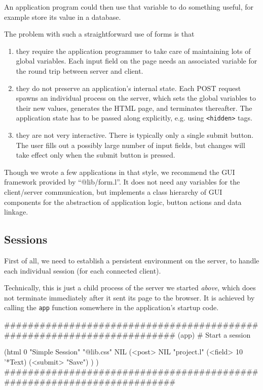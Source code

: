 An application program could then use that variable to do something
useful, for example store its value in a database.

The problem with such a straightforward use of forms is that

\begin{enumerate}
\item they require the application programmer to take care of maintaining
   lots of global variables. Each input field on the page needs an
   associated variable for the round trip between server and client.
\item they do not preserve an application's internal state. Each POST
   request spawns an individual process on the server, which sets the
   global variables to their new values, generates the HTML page, and
   terminates thereafter. The application state has to be passed along
   explicitly, e.g. using \texttt{<hidden>} tags.
\item they are not very interactive. There is typically only a single
   submit button. The user fills out a possibly large number of input
   fields, but changes will take effect only when the submit button is
   pressed.
\end{enumerate}

Though we wrote a few applications in that style, we recommend the GUI
framework provided by ``@lib/form.l''. It does not need any variables for
the client/server communication, but implements a class hierarchy of GUI
components for the abstraction of application logic, button actions and
data linkage.

 
\subsection{Sessions}
\label{sec:appl-devel-sessions}


First of all, we need to establish a persistent environment on the
server, to handle each individual session (for each connected client).

Technically, this is just a child process of the server we started
\emph{above}, which does not terminate immediately after it sent
its page to the browser. It is achieved by calling the \texttt{app} function
somewhere in the application's startup code.


\begin{wideverbatim}
########################################################################
(app)  # Start a session

(html 0 "Simple Session" "@lib.css" NIL
   (<post> NIL "project.l"
      (<field> 10 '*Text)
      (<submit> "Save") ) )
########################################################################
\end{wideverbatim}

